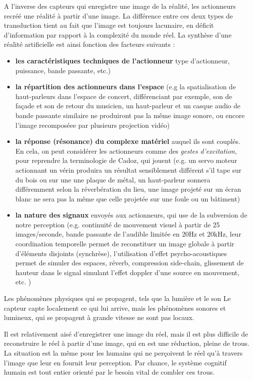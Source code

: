 A l'inverse des capteurs qui enregistre une image de la réalité, les actionneurs recréé une réalité à partir d'une image.
La différence entre ces deux types de transduction tient au fait que l'image est toujours lacunaire, en déficit d'information par rapport à la complexité du monde réel. La synthèse d'une réalité artificielle est ainsi fonction des facteurs suivants :
\vspace{-1em}
\begin{itemize}[noitemsep]
	\item \textbf{les caractéristiques techniques de l'actionneur} type d'actionneur, puissance, bande passante, etc.)
	\item \textbf{la répartition des actionneurs dans l'espace} (e.g la spatialisation de haut-parleurs dans l'espace de concert, différenciant par exemple, son de façade et son de retour du musicien, un haut-parleur et un casque audio de bande passante similaire ne produiront pas la même image sonore, ou encore l'image recomposéee par plusieurs projection vidéo)
	\item \textbf{la réponse (résonance) du complexe matériel} auquel ils sont couplés. En cela, on peut considérer les actionneurs comme des \textit{gestes d'excitation}, pour reprendre la terminologie de Cadoz, qui jouent (e.g. un servo moteur actionnant un vérin produira un résultat sensiblement différent s'il tape sur du bois ou sur une une plaque de métal, un haut-parleur sonnera différemment selon la réverbération du lieu, une image projeté sur un écran blanc ne sera pas la même que celle projetée sur une foule ou un bâtiment)
	\item \textbf{la nature des signaux} envoyés aux actionneurs, qui use de la subversion de notre perception (e.g. continuité de mouvement visuel à partir de 25 images/seconde, bande passante de l'audible limitée en 20Hz et 20kHz, leur coordination temporelle permet de reconstituer un image globale à partir d'éléments disjoints (synchrèse), l'utilisation d'effet psycho-acoustiques permet de simuler des espaces, réverb, compression side-chain, glissement de hauteur dans le signal simulant l'effet doppler d'une source en mouvement, etc. )
\end{itemize}

Les phénomènes physiques qui se propagent, tels que la lumière et le son
Le capteur capte localement ce qui lui arrive, mais les phénomènes sonores et lumineux, qui se propagent à grande vitesse ne sont pas locaux.

Il est relativement aisé d'enregistrer une image du réel, mais il est plus difficile de reconstruire le réel à partir d'une image, qui en est une réduction, pleine de trous. La situation est la même pour les humains qui ne perçoivent le réel qu'à travers l'image que leur en fournit leur perception. Par chance, le système cognitif humain est tout entier orienté par le besoin vital de combler ces trous.


